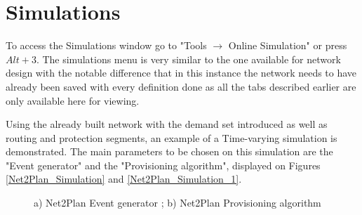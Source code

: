 	
	\newpage
	
	
	\section{Simulations}
	To access the Simulations window go to  "Tools $\rightarrow$ Online Simulation" or press $Alt + 3$. The simulations menu is very similar to the one available for network design with the notable difference that in this instance the network needs to have already been saved with every definition done as all the tabs described earlier are only available here for viewing.
	
	Using the already built network with the demand set introduced as well as routing and protection segments, an example of a Time-varying simulation is demonstrated. The main parameters to be chosen on this simulation are the "Event generator" and the "Provisioning algorithm", displayed on Figures \ref{Net2Plan_Simulation} and \ref{Net2Plan_Simulation_1}.
	
	\vspace{-0.3cm}
	
	\begin{figure}[!h]
		\centering
		\caption{a) Net2Plan Event generator ; b) Net2Plan Provisioning algorithm}
	\end{figure}	

